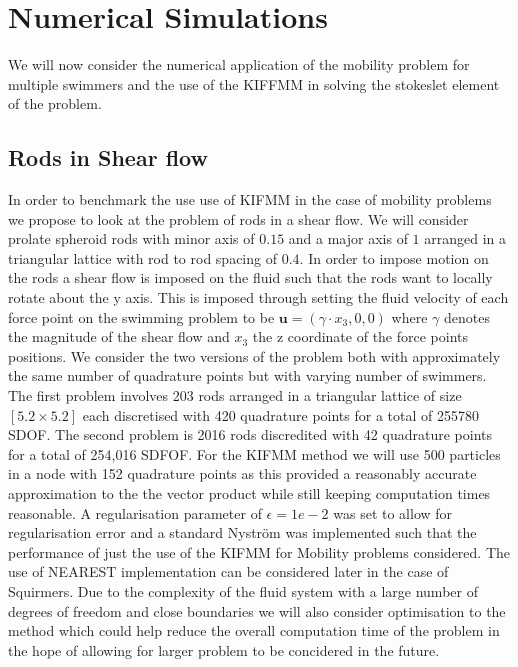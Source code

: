 \FloatBarrier
\section{Numerical Simulations}
We will now consider the numerical application of the mobility problem for multiple swimmers and the use of the KIFFMM in solving the stokeslet element of the problem. 

\subsection{Rods in Shear flow}
In order to benchmark the use use of KIFMM in the case of mobility problems we propose to look at the problem of rods in a shear flow. We will consider prolate spheroid rods with minor axis of $0.15$ and a major axis of $1$ arranged in a triangular lattice with rod to rod spacing of $0.4$. In order to impose motion on the rods a shear flow is imposed on the fluid such that the rods want to locally rotate about the y axis. This is imposed through setting the fluid velocity of each force point on the swimming problem to be $\bm{u} = (\gamma\cdot x_3,0,0)$ where $\gamma$ denotes the magnitude of the shear flow and $x_3$ the z coordinate of the force points positions. We consider the two versions of the problem both with approximately the same number of quadrature points but with varying number of swimmers. The first problem involves 203 rods arranged in a triangular lattice of size $[5.2 \times 5.2]$ each discretised with 420 quadrature points for a total of 255780 SDOF. The second problem is 2016 rods discredited with 42 quadrature points for a total of 254,016 SDFOF.  For the KIFMM method we will use 500 particles in a node with 152 quadrature points as this provided a reasonably accurate approximation to the the vector product while still keeping computation times reasonable. A regularisation parameter of $\epsilon=1e-2$ was set to allow for regularisation error and a standard Nyström was implemented such that the performance of just the use of the KIFMM for Mobility problems considered. The use of NEAREST implementation can be considered later in the case of Squirmers. Due to the complexity of the fluid system with a large number of degrees of freedom and close boundaries we will also consider optimisation to the method which could help reduce the overall computation time of the problem in the hope of allowing for larger problem to be concidered in the future. 


